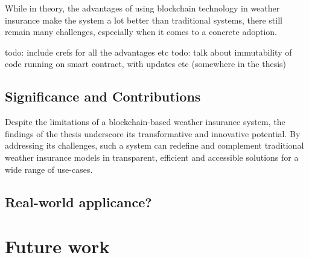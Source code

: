 While in theory, the advantages of using blockchain technology in weather insurance make the system a lot better than traditional systems, there still remain many challenges, especially when it comes to a concrete adoption.

todo: include crefs for all the advantages etc
todo: talk about immutability of code running on smart contract, with updates etc (somewhere in the thesis)

\subsection{Significance and Contributions}
Despite the limitations of a blockchain-based weather insurance system, the findings of the thesis underscore its transformative and innovative potential. By addressing its challenges, such a system can redefine and complement traditional weather insurance models in transparent, efficient and accessible solutions for a wide range of use-cases.

\subsection{Real-world applicance?}



\section{Future work}\label{section:future_work}


